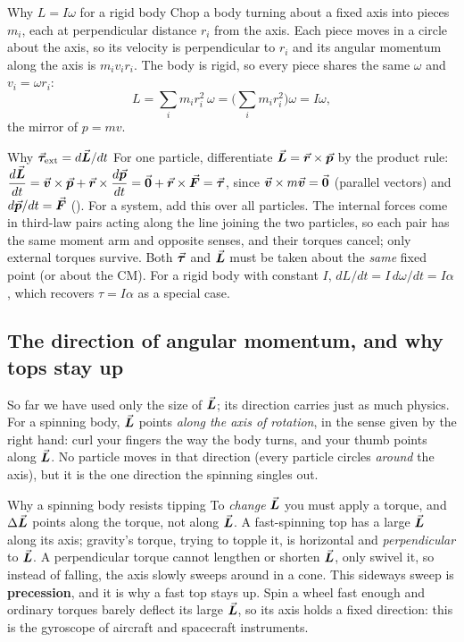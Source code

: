 \begin{derivbox}{Why $L=I\omega$ for a rigid body}
Chop a body turning about a fixed axis into pieces $m_i$, each at perpendicular distance $r_i$ from the
axis. Each piece moves in a circle about the axis, so its velocity is perpendicular to $r_i$ and its
angular momentum along the axis is $m_iv_ir_i$. The body is rigid, so every piece shares the same $\omega$
and $v_i=\omega r_i$:
\[
L=\sum_i m_i r_i^2\,\omega=\Big(\sum_i m_i r_i^2\Big)\omega=I\omega,
\]
the mirror of $p=mv$.
\end{derivbox}

\begin{derivbox}{Why $\vec{\bm{\tau}}_{\text{ext}}=d\vec{\bm{L}}/dt$}
For one particle, differentiate $\vec{\bm{L}}=\vec{\bm{r}}\times\vec{\bm{p}}$ by the product rule:
$\dfrac{d\vec{\bm{L}}}{dt}=\vec{\bm{v}}\times\vec{\bm{p}}+\vec{\bm{r}}\times\dfrac{d\vec{\bm{p}}}{dt}=\vec{\bm{0}}+\vec{\bm{r}}\times\vec{\bm{F}}=\vec{\bm{\tau}}$, since $\vec{\bm{v}}\times m\vec{\bm{v}}=\vec{\bm{0}}$
(parallel vectors) and $d\vec{\bm{p}}/dt=\vec{\bm{F}}$ (). For a system, add this over all particles. The
internal forces come in third-law pairs acting along the line joining the two particles, so each pair has
the same moment arm and opposite senses, and their torques cancel; only external torques survive. Both
$\vec{\bm{\tau}}$ and $\vec{\bm{L}}$ must be taken about the \emph{same} fixed point (or about the CM). For a rigid body with
constant $I$, $dL/dt=I\,d\omega/dt=I\alpha$, which recovers $\tau=I\alpha$ as a special case.
\end{derivbox}

\subsection{The direction of angular momentum, and why tops stay up}

So far we have used only the size of $\vec{\bm{L}}$; its direction carries just as much physics. For a spinning body, $\vec{\bm{L}}$ points \emph{along the axis of rotation}, in the sense given by the right hand:
curl your fingers the way the body turns, and your thumb points along $\vec{\bm{L}}$. No particle moves in that
direction (every particle circles \emph{around} the axis), but it is the one direction the spinning
singles out.

\begin{remarkbox}{Why a spinning body resists tipping}
To \emph{change} $\vec{\bm{L}}$ you must apply a torque, and $\Delta\vec{\bm{L}}$ points along the torque, not along $\vec{\bm{L}}$.
A fast-spinning top has a large $\vec{\bm{L}}$ along its axis; gravity's torque, trying to topple it, is horizontal
and \emph{perpendicular} to $\vec{\bm{L}}$. A perpendicular torque cannot lengthen or shorten $\vec{\bm{L}}$, only swivel
it, so instead of falling, the axis slowly sweeps around in a cone. This sideways sweep is
\textbf{precession}, and it is why a fast top stays up. Spin a wheel fast enough and ordinary torques
barely deflect its large $\vec{\bm{L}}$, so its axis holds a fixed direction: this is the gyroscope of aircraft and
spacecraft instruments.
\end{remarkbox}

